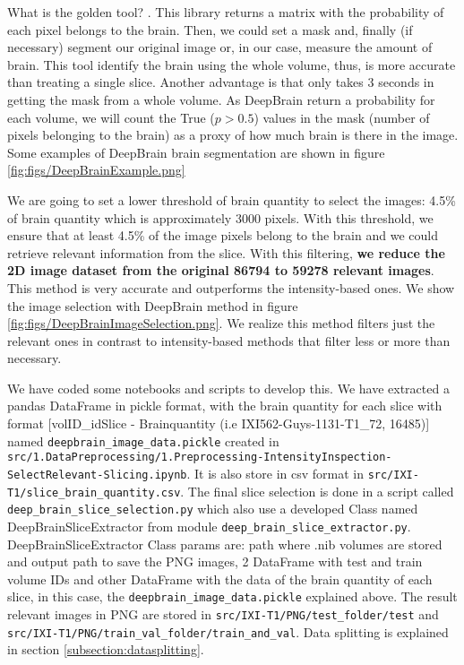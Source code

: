What is the golden tool? . This library returns a matrix with the probability of each pixel belongs to the brain. Then, we could set a mask and, finally (if necessary) segment our original image or, in our case, measure the amount of brain. This tool identify the brain using the whole volume, thus, is more accurate than treating a single slice. Another advantage is that only takes 3 seconds in getting the mask from a whole volume. As DeepBrain return a probability for each volume, we will count the True ($p>0.5$) values in the mask (number of pixels belonging to the brain) as a proxy of how much brain is there in the image.  Some examples of DeepBrain brain segmentation are shown in figure \ref{fig:figs/DeepBrainExample.png}


We are going to set a lower threshold of brain quantity to select the images: 4.5\% of brain quantity which is approximately 3000 pixels. With this threshold, we ensure that at least 4.5\% of the image pixels belong to the brain and we could retrieve relevant information from the slice. With this filtering, \textbf{we reduce the 2D image dataset from the original 86794 to 59278 relevant images}. This method is very accurate and outperforms the intensity-based ones. We show the image selection with DeepBrain method in figure \ref{fig:figs/DeepBrainImageSelection.png}. We realize this method filters just the relevant ones in contrast to intensity-based methods that filter less or more than necessary.


We have coded some notebooks and scripts to develop this. We have extracted a pandas DataFrame in pickle format, with the brain quantity for each slice with format [volID\_idSlice - Brainquantity (i.e IXI562-Guys-1131-T1\_72, 16485)] named \texttt{deepbrain\-\_image\-\_data\-.pickle} created in \texttt{src/\-1.DataPreprocessing/\-1.Preprocessing\--IntensityInspection\--Select\-Rel\-evant\--Slicing\-.ipynb}. It is also store in csv format in \texttt{src\-/IXI-T1\-/slice\_\-brain\_\-quantity.csv}.  The final slice selection is done in a script called \texttt{deep\_brain\_slice\_selection.py} which also use a developed Class named DeepBrainSliceExtractor from module \texttt{deep\-\_brain\-\_slice\-\_extractor.py}. DeepBrainSliceExtractor Class params are: path where .nib volumes are stored and output path to save the PNG images, 2 DataFrame with test and train volume IDs and other DataFrame with the data of the brain quantity of each slice, in this case, the \texttt{deepbrain\-\_image\-\_data\-.pickle} explained above. The result relevant images in PNG are stored in \texttt{src\-/IXI\--T1\-/PNG\-/test\_folder\-/test} and \texttt{src\-/IXI\--T1\-/PNG\-/train\-\_val\-\_folder\-/train\-\_and\-\_val}. Data splitting is explained in section \ref{subsection:datasplitting}.

